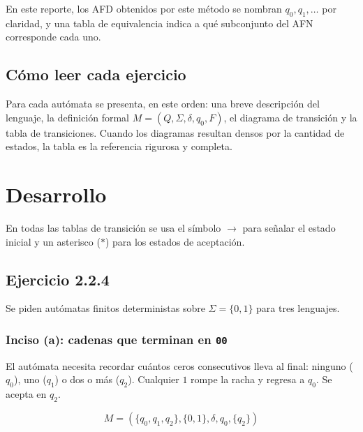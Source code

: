 \documentclass[12pt]{article}
\begin{document}
En este reporte, los AFD obtenidos por este método se nombran $q_0,q_1,\dots$ por claridad, y una tabla de equivalencia indica a qué subconjunto del AFN corresponde cada uno.

\subsection{Cómo leer cada ejercicio}

Para cada autómata se presenta, en este orden: una breve descripción del lenguaje, la definición formal $M=(Q,\Sigma,\delta,q_0,F)$, el diagrama de transición y la tabla de transiciones. Cuando los diagramas resultan densos por la cantidad de estados, la tabla es la referencia rigurosa y completa.


\clearpage
\section{Desarrollo}

En todas las tablas de transición se usa el símbolo $\rightarrow$ para señalar el estado inicial y un asterisco ($*$) para los estados de aceptación.

\subsection{Ejercicio 2.2.4}

Se piden autómatas finitos deterministas sobre $\Sigma=\{0,1\}$ para tres lenguajes.

\subsubsection{Inciso (a): cadenas que terminan en \texttt{00}}

El autómata necesita recordar cuántos ceros consecutivos lleva al final: ninguno ($q_0$), uno ($q_1$) o dos o más ($q_2$). Cualquier $1$ rompe la racha y regresa a $q_0$. Se acepta en $q_2$.

\[
M=(\{q_0,q_1,q_2\},\{0,1\},\delta,q_0,\{q_2\})
\]

\begin{center}
\end{center}
\end{document}
